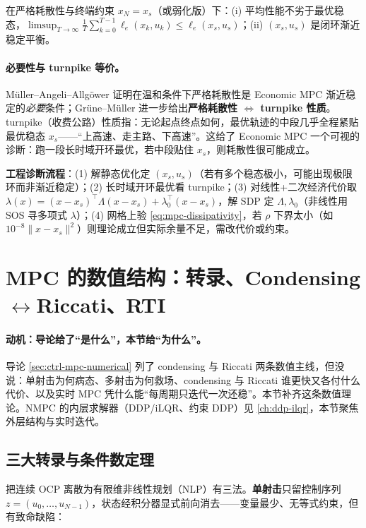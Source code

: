 \begin{theorem}
\label{thm:mpc-angeli}
在严格耗散性与终端约束 $x_N=x_s$（或弱化版）下：(i) 平均性能不劣于最优稳态，$\limsup_{T\to\infty}\tfrac1T\sum_{k=0}^{T-1}\ell_e(x_k,u_k)\le\ell_e(x_s,u_s)$；(ii) $(x_s,u_s)$ 是闭环渐近稳定平衡。
\end{theorem}

\paragraph{必要性与 turnpike 等价。}
Müller--Angeli--Allgöwer 证明在温和条件下严格耗散性是 Economic MPC 渐近稳定的\emph{必要}条件；Grüne--Müller 进一步给出\textbf{严格耗散性 $\Longleftrightarrow$ turnpike 性质}。turnpike（收费公路）性质指：无论起点终点如何，最优轨迹的中段几乎全程紧贴最优稳态 $x_s$——“上高速、走主路、下高速”。这给了 Economic MPC 一个可视的诊断：跑一段长时域开环最优，若中段贴住 $x_s$，则耗散性很可能成立。

\begin{remark}
\textbf{工程诊断流程}：(1) 解静态优化定 $(x_s,u_s)$（若有多个稳态极小，可能出现极限环而非渐近稳定）；(2) 长时域开环最优看 turnpike；(3) 对线性+二次经济代价取 $\lambda(x)=(x-x_s)^\top\Lambda(x-x_s)+\lambda_0^\top(x-x_s)$，解 SDP 定 $\Lambda,\lambda_0$（非线性用 SOS 寻多项式 $\lambda$）；(4) 网格上验 \cref{eq:mpc-dissipativity}，若 $\rho$ 下界太小（如 $10^{-8}\|x-x_s\|^2$）则理论成立但实际余量不足，需改代价或约束。
\end{remark}

\section{MPC 的数值结构：转录、Condensing\texorpdfstring{$\leftrightarrow$}{<->}Riccati、RTI}
\label{sec:mpc-numerical}

\paragraph{动机：导论给了“是什么”，本节给“为什么”。}
导论 \cref{sec:ctrl-mpc-numerical} 列了 condensing 与 Riccati 两条数值主线，但没说：单射击为何病态、多射击为何救场、condensing 与 Riccati 谁更快又各付什么代价、以及实时 MPC 凭什么能“每周期只迭代一次还稳”。本节补齐这条数值理论。NMPC 的内层求解器（DDP/iLQR、约束 DDP）见 \cref{ch:ddp-ilqr}，本节聚焦外层结构与实时迭代。

\subsection{三大转录与条件数定理}
\label{sec:mpc-transcription}
把连续 OCP 离散为有限维非线性规划（NLP）有三法。\textbf{单射击}只留控制序列 $z=(u_0,\dots,u_{N-1})$，状态经积分器显式前向消去——变量最少、无等式约束，但有致命缺陷：

